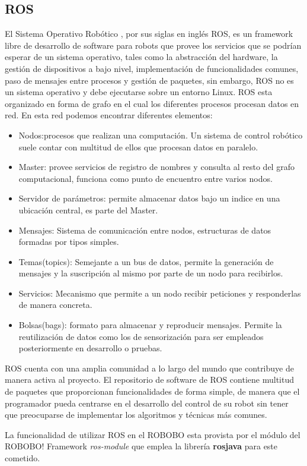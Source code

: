 \subsection{ROS}
\label{subsec:ros}

El Sistema Operativo Robótico\cite{Ros} , por sus siglas en inglés ROS, es un framework libre de desarrollo de software para robots que provee los servicios que se podrían esperar de un sistema operativo, tales como la abstracción del hardware, la gestión de dispositivos a bajo nivel, implementación de funcionalidades comunes, paso de mensajes entre procesos y gestión de paquetes, sin embargo, ROS no es un sistema operativo y debe ejecutarse sobre un entorno Linux.
ROS esta organizado en forma de grafo en el cual los diferentes procesos procesan datos en red. En esta red podemos encontrar diferentes elementos:
\begin{itemize}
	\item Nodos:procesos que realizan una computación. Un sistema de control robótico suele contar con multitud de ellos que procesan datos en paralelo.
	\item Master: provee servicios de registro de nombres y consulta al resto del grafo computacional, funciona como punto de encuentro entre varios nodos.
	
	\item Servidor de parámetros: permite almacenar datos bajo un indice en una ubicación central, es parte del Master.
	\item Mensajes: Sistema de comunicación entre nodos, estructuras de datos formadas por tipos simples.
	\item Temas(topics): Semejante a un bus de datos, permite la generación de mensajes y la suscripción al mismo por parte de un nodo para recibirlos.
	\item Servicios: Mecanismo que permite a un nodo recibir peticiones y responderlas de manera concreta.
	\item Bolsas(bags): formato para almacenar y reproducir mensajes. Permite la reutilización de datos como los de sensorización para ser empleados posteriormente en desarrollo o pruebas.
\end{itemize}

ROS cuenta con una amplia comunidad a lo largo del mundo que contribuye de manera activa al proyecto. 
El repositorio de software de ROS contiene multitud de paquetes que proporcionan funcionalidades de forma simple, de manera que el programador pueda centrarse en el desarrollo del control de su robot sin tener que preocuparse de implementar los algoritmos y técnicas más comunes.

La funcionalidad de utilizar ROS en el ROBOBO esta provista por el módulo del ROBOBO! Framework \textit{ros-module} que  emplea la librería \textbf{rosjava} para este cometido.











 